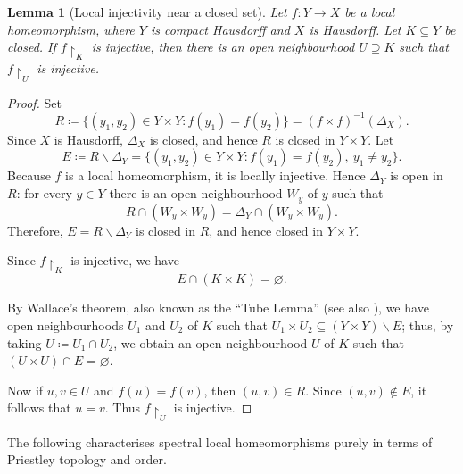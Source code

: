 \documentclass[12pt]{amsart}
\theoremstyle{plain}
\newtheorem{lemma}[theorem]{Lemma}
\theoremstyle{definition}
\begin{document}
\begin{lemma}[Local injectivity near a closed set]\label{lem:local-inj-neighbourhood-closed-set}
    Let $f \colon Y \to X$ be a local homeomorphism, where $Y$ is compact Hausdorff and
    $X$ is Hausdorff. Let $K \subseteq Y$ be closed. If $f{\restriction}_{K}$ is injective,
    then there is an open neighbourhood $U\supseteq K$ such that
    $f{\restriction}_{U}$ is injective.
\end{lemma}
\begin{proof}
    Set
    \[
    R \coloneqq \{(y_1,y_2)\in Y\times Y : f(y_1)=f(y_2)\}
          = (f\times f)^{-1}(\Delta_X).
    \]
    Since $X$ is Hausdorff, $\Delta_X$ is closed, and hence $R$ is closed in $Y\times Y$. Let
    \[
    E \coloneqq R \smallsetminus \Delta_Y
      = \{(y_1,y_2)\in Y\times Y : f(y_1)=f(y_2),\ y_1\neq y_2\}.
    \]
    Because $f$ is a local homeomorphism, it is locally injective. Hence $\Delta_Y$ is open in
    $R$: for every $y\in Y$ there is an open neighbourhood $W_y$ of $y$ such that
    \[
    R \cap (W_y\times W_y)=\Delta_Y \cap (W_y\times W_y).
    \]
    Therefore, $E=R\smallsetminus\Delta_Y$ is closed in $R$, and hence closed in $Y\times Y$.
    
    Since $f{\restriction}_K$ is injective, we have
    \[
    E \cap (K\times K)=\varnothing.
    \]
    
    By Wallace's theorem, also known as the ``Tube Lemma'' \cite[Lem.~26.8]{munkres2000topology} (see also \cite[\href{https://stacks.math.columbia.edu/tag/005N}{Tag 005N}]{stacks-project}), we have open neighbourhoods $U_1$ and $U_2$ of $K$ such that $U_1\times U_2\subseteq (Y\times Y)\smallsetminus E$; thus, by taking $U\coloneqq U_{1}\cap U_{2}$, we obtain an open neighbourhood $U$ of $K$ such that  $(U\times U)\cap E=\varnothing$.
    
    Now if $u,v\in U$ and $f(u)=f(v)$, then $(u,v)\in R$. Since $(u,v)\notin E$, it follows
    that $u=v$. Thus $f{\restriction}_U$ is injective.
\end{proof}


The following characterises spectral local homeomorphisms purely in terms of Priestley topology and order.
\end{document}
